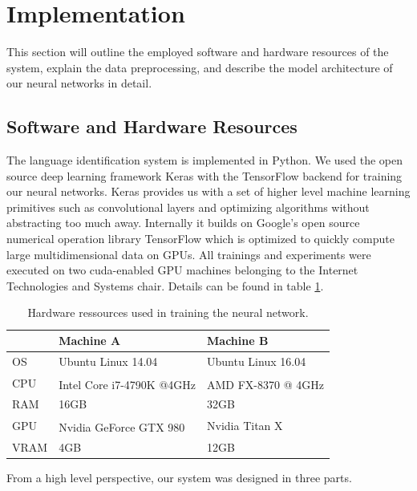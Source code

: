\section{Implementation}
This section will outline the employed software and hardware resources of the system, explain the data preprocessing, and describe the model architecture of our neural networks in detail.

\subsection{Software and Hardware Resources}

	The language identification system is implemented in Python. We used the open source deep learning framework Keras\cite{chollet2015keras} with the TensorFlow\cite{abadi2016tensorflow} backend for training our neural networks. Keras provides us with a set of higher level machine learning primitives such as convolutional layers and optimizing algorithms without abstracting too much away. Internally it builds on Google's open source numerical operation library TensorFlow which is optimized to quickly compute large multidimensional data on GPUs.
		All trainings and experiments were executed on two cuda-enabled GPU machines belonging to the Internet Technologies and Systems chair. Details can be found in table \ref{tab:hardware}.
		
	\begin{table}[h]
	\centering
	\begin{tabularx}{\textwidth}{lll}
	\toprule
	  		& Machine A 					& Machine B \\ \midrule
	OS  	& Ubuntu Linux 14.04 		& Ubuntu Linux 16.04 \\
	CPU  	& Intel\textsuperscript{\textregistered} Core\textsuperscript{\texttrademark} i7-4790K @4GHz 	& AMD FX\textsuperscript{\texttrademark}-8370  @ 4GHz \\
	RAM  	& 16GB 						& 32GB \\
	GPU  	& Nvidia GeForce\textsuperscript{\textregistered} GTX 980 	& Nvidia Titan X \\
	VRAM  	& 4GB 						& 12GB \\
	\bottomrule
	\end{tabularx}
	\caption{Hardware ressources used in training the neural network.}
	\label{tab:hardware}
	\end{table}
	 
	From a high level perspective, our system was designed in three parts. 
	
